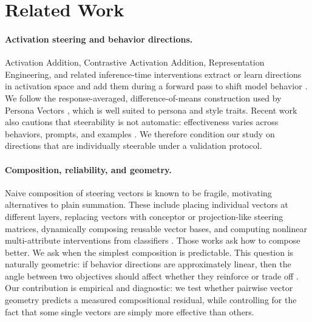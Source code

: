 \documentclass{article}
\begin{document}
\section{Related Work}

\paragraph{Activation steering and behavior directions.}
Activation Addition, Contrastive Activation Addition, Representation Engineering, and related
inference-time interventions extract or learn directions in activation space and add them during a
forward pass to shift model behavior \citep{turner2023actadd,panickssery2024caa,zou2023repe,li2023iti}.
We follow the response-averaged, difference-of-means construction used by Persona Vectors
\citep{chen2025persona}, which is well suited to persona and style traits. Recent work also cautions
that steerability is not automatic: effectiveness varies across behaviors, prompts, and examples
\citep{tan2024analysing,imli2025unified}. We therefore condition our study on directions that are
individually steerable under a validation protocol.

\paragraph{Composition, reliability, and geometry.}
Naive composition of steering vectors is known to be fragile, motivating alternatives to plain
summation. These include placing individual vectors at different layers, replacing vectors with
conceptor or projection-like steering matrices, dynamically composing reusable vector bases, and
computing nonlinear multi-attribute interventions from classifiers
\citep{vanderweij2024extending,postmus2024conceptorsteering,han2026steer2adapt,oozeer2025beyond}.
Those works ask how to compose better. We ask when the simplest composition is predictable. This
question is naturally geometric: if behavior directions are approximately linear, then the angle
between two objectives should affect whether they reinforce or trade off \citep{park2024linear,young2026alignmenttax}.
Our contribution is empirical and diagnostic: we test whether pairwise vector geometry predicts a
measured compositional residual, while controlling for the fact that some single vectors are simply
more effective than others.
\end{document}
